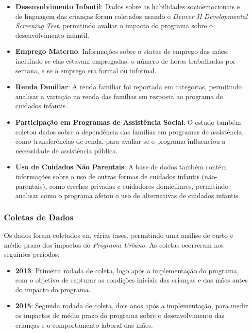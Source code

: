 \documentclass[a4paper,12pt]{article}[abntex2]
\begin{document}
\begin{itemize}
    \item \textbf{Desenvolvimento Infantil}: Dados sobre as habilidades socioemocionais e de linguagem das crianças foram coletados usando o \textit{Denver II Developmental Screening Test}, permitindo avaliar o impacto do programa sobre o desenvolvimento infantil.
    
    \item \textbf{Emprego Materno}: Informações sobre o status de emprego das mães, incluindo se elas estavam empregadas, o número de horas trabalhadas por semana, e se o emprego era formal ou informal.
    
    \item \textbf{Renda Familiar}: A renda familiar foi reportada em categorias, permitindo analisar a variação na renda das famílias em resposta ao programa de cuidados infantis.
    
    \item \textbf{Participação em Programas de Assistência Social}: O estudo também coletou dados sobre a dependência das famílias em programas de assistência, como transferências de renda, para avaliar se o programa influenciou a necessidade de assistência pública.
    
    \item \textbf{Uso de Cuidados Não Parentais}: A base de dados também contém informações sobre o uso de outras formas de cuidados infantis (não-parentais), como creches privadas e cuidadores domiciliares, permitindo analisar como o programa afetou o uso de alternativas de cuidados infantis.
\end{itemize}

\subsubsection*{Coletas de Dados}

Os dados foram coletados em várias fases, permitindo uma análise de curto e médio prazo dos impactos do \textit{Programa Urbano}. As coletas ocorreram nos seguintes períodos:

\begin{itemize}
    \item \textbf{2013}: Primeira rodada de coleta, logo após a implementação do programa, com o objetivo de capturar as condições iniciais das crianças e das mães antes do impacto do programa.
    \item \textbf{2015}: Segunda rodada de coleta, dois anos após a implementação, para medir os impactos de médio prazo do programa sobre o desenvolvimento das crianças e o comportamento laboral das mães.
\end{itemize}
\end{document}
